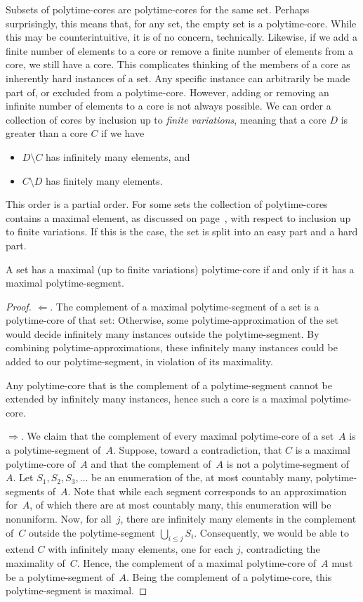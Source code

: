 Subsets of polytime-cores are polytime-cores for the same set.
Perhaps surprisingly, this means that, for any set, the empty set is a polytime-core.
While this may be counterintuitive, it is of no concern, technically.
Likewise, if we add a finite number of elements to a core or remove a finite number of elements from a core, we still have a core.
This complicates thinking of the members of a core as inherently hard instances of a set.
Any specific instance can arbitrarily be made part of, or excluded from a polytime-core.
However, adding or removing an infinite number of elements to a core is not always possible.
We can order a collection of cores by inclusion up to \emph{finite variations}, meaning that a core $D$ is greater than a core $C$ if we have
\begin{itemize}
\item $D \setminus C$ has infinitely many elements, and
\item $C \setminus D$ has finitely many elements.
\end{itemize}
This order is a partial order.
For some sets the collection of polytime-cores contains a maximal element, as discussed on page~\pageref{def:maximal}, with respect to inclusion up to finite variations.
If this is the case, the set is split into an easy part and a hard part.
\begin{theorem}
\label{thm:maximal}%
  A set has a maximal (up to finite variations) polytime-core if and only if it has a maximal polytime-segment.
\end{theorem}
\begin{proof}
  $\Longleftarrow$.
  The complement of a maximal polytime-segment of a set is a polytime-core of that set:
  Otherwise, some polytime-approximation of the set would decide infinitely many instances outside the polytime-segment.
  By combining polytime-approximations, these infinitely many instances could be added to our polytime-segment, in violation of its maximality.

  Any polytime-core that is the complement of a polytime-segment cannot be extended by infinitely many instances, hence such a core is a maximal polytime-core.

  $\Longrightarrow$.
  We claim that the complement of every maximal polytime-core of a set~$A$ is a polytime-segment of~$A$.
  Suppose, toward a contradiction, that $C$ is a maximal polytime-core of~$A$ and that the complement of~$A$ is not a polytime-segment of~$A$.
  Let $S_1, S_2, S_3, \ldots$ be an enumeration of the, at most countably many, polytime-segments of~$A$.
  Note that while each segment corresponds to an approximation for~$A$, of which there are at most countably many, this enumeration will be nonuniform.
  Now, for all~$j$, there are infinitely many elements in the complement of~$C$ outside the polytime-segment $\bigcup_{i \le j} S_i$.
  Consequently, we would be able to extend $C$ with infinitely many elements, one for each $j$, contradicting the maximality of~$C$.
  Hence, the complement of a maximal polytime-core of~$A$ must be a polytime-segment of~$A$.
  Being the complement of a polytime-core, this polytime-segment is maximal.
\end{proof}

